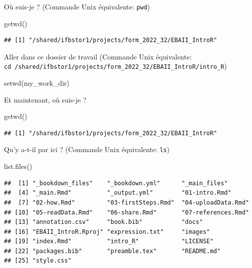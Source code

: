 \documentclass[
]{book}
\newenvironment{Shaded}{\begin{snugshade}}{\end{snugshade}}
\newcommand{\FunctionTok}[1]{\textcolor[rgb]{0.00,0.00,0.00}{#1}}
\newcommand{\NormalTok}[1]{#1}
\begin{document}
Où suis-je ? (Commande Unix équivalente: \texttt{pwd})

\begin{Shaded}
\begin{Highlighting}[]
\FunctionTok{getwd}\NormalTok{()}
\end{Highlighting}
\end{Shaded}

\begin{verbatim}
## [1] "/shared/ifbstor1/projects/form_2022_32/EBAII_IntroR"
\end{verbatim}

Aller dans ce dossier de travail (Commande Unix équivalente: \texttt{cd\ /shared/ifbstor1/projects/form\_2022\_32/EBAII\_IntroR/intro\_R})

\begin{Shaded}
\begin{Highlighting}[]
\FunctionTok{setwd}\NormalTok{(my\_work\_dir)}
\end{Highlighting}
\end{Shaded}

Et maintenant, où suis-je ?

\begin{Shaded}
\begin{Highlighting}[]
\FunctionTok{getwd}\NormalTok{()}
\end{Highlighting}
\end{Shaded}

\begin{verbatim}
## [1] "/shared/ifbstor1/projects/form_2022_32/EBAII_IntroR"
\end{verbatim}

Qu'y a-t-il par ici ? (Commande Unix équivalente: \texttt{ls})

\begin{Shaded}
\begin{Highlighting}[]
\FunctionTok{list.files}\NormalTok{()}
\end{Highlighting}
\end{Shaded}

\begin{verbatim}
##  [1] "_bookdown_files"    "_bookdown.yml"      "_main_files"       
##  [4] "_main.Rmd"          "_output.yml"        "01-intro.Rmd"      
##  [7] "02-how.Rmd"         "03-firstSteps.Rmd"  "04-uploadData.Rmd" 
## [10] "05-readData.Rmd"    "06-share.Rmd"       "07-references.Rmd" 
## [13] "annotation.csv"     "book.bib"           "docs"              
## [16] "EBAII_IntroR.Rproj" "expression.txt"     "images"            
## [19] "index.Rmd"          "intro_R"            "LICENSE"           
## [22] "packages.bib"       "preamble.tex"       "README.md"         
## [25] "style.css"
\end{verbatim}
\end{document}
